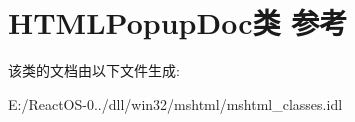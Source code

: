 \hypertarget{class_h_t_m_l_popup_doc}{}\section{H\+T\+M\+L\+Popup\+Doc类 参考}
\label{class_h_t_m_l_popup_doc}


该类的文档由以下文件生成\+:\begin{DoxyCompactItemize}
\item 
E\+:/\+React\+O\+S-\/0../dll/win32/mshtml/mshtml\+\_\+classes.\+idl\end{DoxyCompactItemize}
